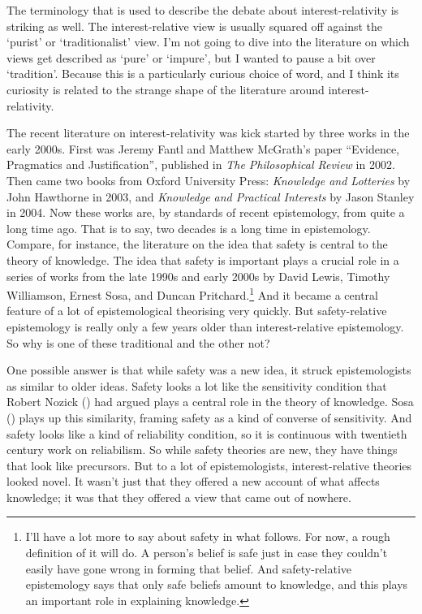 \documentclass[
  12pt,
  letterpaper,
]{scrbook}
\begin{document}
The terminology that is used to describe the debate about
interest-relativity is striking as well. The interest-relative view is
usually squared off against the `purist' or `traditionalist' view. I'm
not going to dive into the literature on which views get described as
`pure' or `impure', but I wanted to pause a bit over `tradition'.
Because this is a particularly curious choice of word, and I think its
curiosity is related to the strange shape of the literature around
interest-relativity.

The recent literature on interest-relativity was kick started by three
works in the early 2000s. First was Jeremy Fantl and Matthew McGrath's
paper ``Evidence, Pragmatics and Justification'', published in \emph{The
Philosophical Review} in 2002. Then came two books from Oxford
University Press: \emph{Knowledge and Lotteries} by John Hawthorne in
2003, and \emph{Knowledge and Practical Interests} by Jason Stanley in
2004. Now these works are, by standards of recent epistemology, from
quite a long time ago. That is to say, two decades is a long time in
epistemology. Compare, for instance, the literature on the idea that
safety is central to the theory of knowledge. The idea that safety is
important plays a crucial role in a series of works from the late 1990s
and early 2000s by David Lewis, Timothy Williamson, Ernest Sosa, and
Duncan Pritchard.\footnote{I'll have a lot more to say about safety in
  what follows. For now, a rough definition of it will do. A person's
  belief is safe just in case they couldn't easily have gone wrong in
  forming that belief. And safety-relative epistemology says that only
  safe beliefs amount to knowledge, and this plays an important role in
  explaining knowledge.} And it became a central feature of a lot of
epistemological theorising very quickly. But safety-relative
epistemology is really only a few years older than interest-relative
epistemology. So why is one of these traditional and the other not?

One possible answer is that while safety was a new idea, it struck
epistemologists as similar to older ideas. Safety looks a lot like the
sensitivity condition that Robert Nozick
() had argued plays a central role in the
theory of knowledge. Sosa () plays up this
similarity, framing safety as a kind of converse of sensitivity. And
safety looks like a kind of reliability condition, so it is continuous
with twentieth century work on reliabilism. So while safety theories are
new, they have things that look like precursors. But to a lot of
epistemologists, interest-relative theories looked novel. It wasn't just
that they offered a new account of what affects knowledge; it was that
they offered a view that came out of nowhere.
\end{document}
